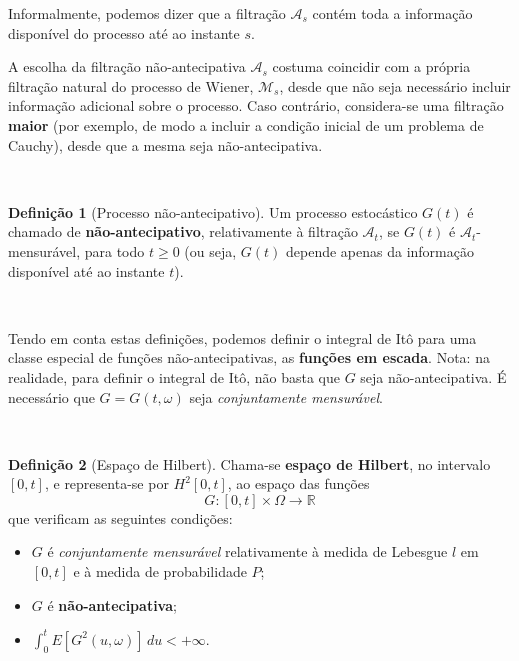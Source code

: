 \documentclass[
  11pt,
  a4paper,
]{book}
\theoremstyle{definition}
\newtheorem{definition}{Definição}[chapter]
\theoremstyle{definition}
\theoremstyle{definition}
\theoremstyle{definition}
\theoremstyle{remark}
\begin{document}
Informalmente, podemos dizer que a filtração \(\mathcal{A}_s\) contém toda a informação disponível do processo até ao instante \(s\).

A escolha da filtração não-antecipativa \(\mathcal{A}_s\) costuma coincidir com a própria filtração natural do processo de Wiener, \(\mathcal{M}_s\), desde que não seja necessário incluir informação adicional sobre o processo. Caso contrário, considera-se uma filtração \textbf{maior} (por exemplo, de modo a incluir a condição inicial de um problema de Cauchy), desde que a mesma seja não-antecipativa.

\(\,\)

\begin{definition}[Processo não-antecipativo]
Um processo estocástico \(G(t)\) é chamado de \textbf{não-antecipativo}, relativamente à filtração \(\mathcal{A}_t\), se \(G(t)\) é \(\mathcal{A}_t\)-mensurável, para todo \(t \geq 0\) (ou seja, \(G(t)\) depende apenas da informação disponível até ao instante \(t\)).
\end{definition}

\(\,\)

Tendo em conta estas definições, podemos definir o integral de Itô para uma classe especial de funções não-antecipativas, as \textbf{funções em escada}. Nota: na realidade, para definir o integral de Itô, não basta que \(G\) seja não-antecipativa. É necessário que \(G = G(t,\omega)\) seja \emph{conjuntamente mensurável}.

\(\,\)

\begin{definition}[Espaço de Hilbert]

Chama-se \textbf{espaço de Hilbert}, no intervalo \([0,t]\), e representa-se por \(H^2[0,t]\), ao espaço das funções
\[ G:[0,t] \times \Omega \rightarrow \mathbb{R} \]
que verificam as seguintes condições:

\begin{itemize}
\item
  \(G\) é \emph{conjuntamente mensurável} relativamente à medida de Lebesgue \(l\) em \([0,t]\) e à medida de probabilidade \(P\);
\item
  \(G\) é \textbf{não-antecipativa};
\item
  \(\displaystyle \int_{0}^{t}{E[G^2(u,\omega)]\,du} < +\infty\).
\end{itemize}

\end{definition}

\(\,\)
\end{document}
